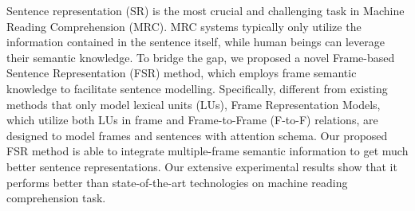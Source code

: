 Sentence representation (SR) is the most crucial and challenging task in Machine Reading Comprehension (MRC). MRC systems typically only utilize the information contained in the sentence itself, while human beings can leverage their semantic knowledge. To bridge the gap, we proposed a novel Frame-based Sentence Representation (FSR) method, which employs frame semantic knowledge to facilitate sentence modelling. Specifically, different from existing methods that only model lexical units (LUs), Frame Representation Models, which utilize both LUs in frame and Frame-to-Frame (F-to-F) relations, are designed to model frames and sentences with attention schema. Our proposed FSR method is able to integrate multiple-frame semantic information to get much better sentence representations. Our extensive experimental results show that it performs better than state-of-the-art technologies on machine reading comprehension task.
